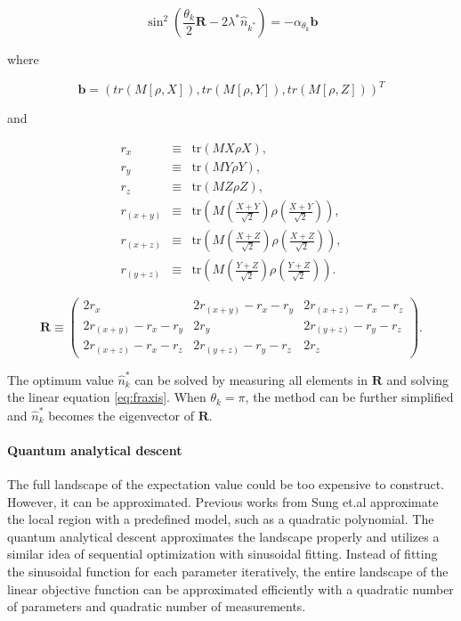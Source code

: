 \begin{equation}
    \sin^2(\frac{\theta_k}{2}\mathbf{R} - 2\lambda^*\hat{n}_{k^*}) = -\alpha_{\theta_k}\mathbf{b}
\end{equation}

where 

\begin{equation}
    \mathbf{b} = (tr(M[\rho,X]),tr(M[\rho,Y]),tr(M[\rho,Z]))^T \label{eq:fraxis}
\end{equation}

and 


\begin{eqnarray}
    r_x &\equiv& \mbox{tr}\left(MX\rho X\right),\\
    r_y &\equiv& \mbox{tr}\left(MY\rho Y\right),\\
    r_z &\equiv& \mbox{tr}\left(MZ\rho Z\right),\\
    r_{(x+y)} &\equiv& \mbox{tr}\left(M \left(\frac{X+Y}{\sqrt{2}}\right) \rho  \left(\frac{X+Y}{\sqrt{2}}\right)\right),\\
    r_{(x+z)} &\equiv& \mbox{tr}\left(M \left(\frac{X+Z}{\sqrt{2}}\right) \rho  \left(\frac{X+Z}{\sqrt{2}}\right)\right),\\
    r_{(y+z)} &\equiv& \mbox{tr}\left(M \left(\frac{Y+Z}{\sqrt{2}}\right) \rho  \left(\frac{Y+Z}{\sqrt{2}}\right)\right).
\end{eqnarray}

\begin{equation}\label{eq:R-def}
    \mathbf{R} \equiv 
    \begin{pmatrix}
    2r_x  & 2r_{(x+y)} - r_x - r_y & 2r_{(x+z)} - r_x - r_z\\
    2r_{(x+y)} - r_x - r_y & 2r_y & 2r_{(y+z)} - r_y - r_z \\
    2r_{(x+z)} - r_x - r_z & 2r_{(y+z)} - r_y - r_z & 2r_z
    \end{pmatrix}.
\end{equation}

The optimum value $\hat{n}_k^*$ can be solved by measuring all elements in $\mathbf{R}$ and solving the linear equation \ref{eq:fraxis}.   When $\theta_k = \pi$, the method can be further simplified and $\hat{n}_k^*$ becomes the eigenvector of $\mathbf{R}$.  

\paragraph{Quantum analytical descent}

The full landscape of the expectation value could be too expensive to construct. However, it can be approximated. Previous works from Sung et.al \cite{sung_using_2020} approximate the local region with a predefined model, such as a quadratic polynomial.  The quantum analytical descent \cite{koczor_quantum_2020} approximates the landscape properly and utilizes a similar idea of sequential optimization with sinusoidal fitting.  Instead of fitting the sinusoidal function for each parameter iteratively, the entire landscape of the linear objective function can be approximated efficiently with a quadratic number of parameters and quadratic number of measurements. 

